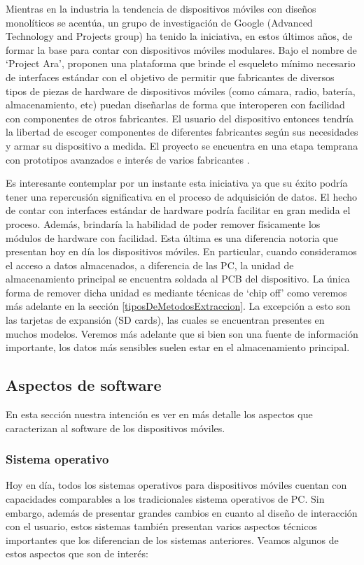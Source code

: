 Mientras en la industria la tendencia de dispositivos móviles con diseños monolíticos se acentúa, un grupo de investigación de Google (Advanced Technology and Projects group) ha tenido la iniciativa, en estos últimos años, de formar la base para contar con dispositivos móviles modulares. Bajo el nombre de \enquote*{Project Ara}, proponen una plataforma que brinde el esqueleto mínimo necesario de interfaces estándar con el objetivo de permitir que fabricantes de diversos tipos de piezas de hardware de dispositivos móviles (como cámara, radio, batería, almacenamiento, etc) puedan diseñarlas de forma que interoperen con facilidad con componentes de otros fabricantes. El usuario del dispositivo entonces tendría la libertad de escoger componentes de diferentes fabricantes según sus necesidades y armar su dispositivo a medida. El proyecto se encuentra en una etapa temprana con prototipos avanzados e interés de varios fabricantes \cite{projectAra}.

Es interesante contemplar por un instante esta iniciativa ya que su éxito podría tener una repercusión significativa en el proceso de adquisición de datos. El hecho de contar con interfaces estándar de hardware podría facilitar en gran medida el proceso. Además, brindaría la habilidad de poder remover físicamente los módulos de hardware con facilidad. Esta última es una diferencia notoria que presentan hoy en día los dispositivos móviles. En particular, cuando consideramos el acceso a datos almacenados, a diferencia de las PC, la unidad de almacenamiento principal se encuentra soldada al PCB del dispositivo. La única forma de remover dicha unidad es mediante técnicas de \enquote*{chip off} como veremos más adelante en la sección \ref{tiposDeMetodosExtraccion}. La excepción a esto son las tarjetas de expansión (SD cards), las cuales se encuentran presentes en muchos modelos. Veremos más adelante que si bien son una fuente de información importante, los datos más sensibles suelen estar en el almacenamiento principal.

\subsection{Aspectos de software}
En esta sección nuestra intención es ver en más detalle los aspectos que caracterizan al software de los dispositivos móviles.

\subsubsection{Sistema operativo}
Hoy en día, todos los sistemas operativos para dispositivos móviles cuentan con capacidades comparables a los tradicionales sistema operativos de PC. Sin embargo, además de presentar grandes cambios en cuanto al diseño de interacción con el usuario, estos sistemas también presentan varios aspectos técnicos importantes que los diferencian de los sistemas anteriores. Veamos algunos de estos aspectos que son de interés:

